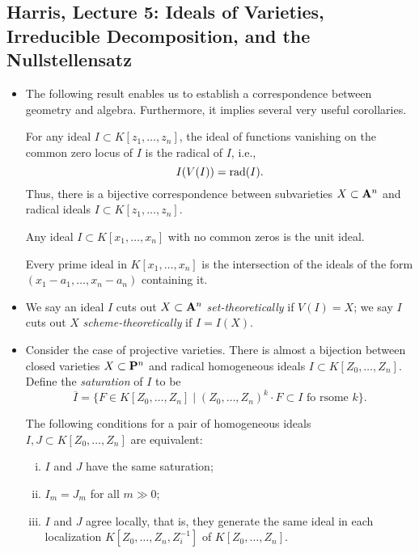 \subsection{Harris, Lecture 5: Ideals of Varieties, Irreducible Decomposition, and the Nullstellensatz}

\begin{itemize}
\item
  The following result enables us to establish a correspondence between geometry and algebra. Furthermore, it implies several very useful corollaries.

  \begin{theorem}[Nullstellensatz]
    For any ideal $I \subset K[z_1, \dots, z_n]$, the ideal of functions vanishing on the common zero locus of $I$ is the radical of $I$, i.e.,
    \[
    I(V(I)) = \rad(I).
    \]
    Thus, there is a bijective correspondence between subvarieties $X \subset \A^n$ and radical ideals $I \subset K[z_1, \dots, z_n]$.
  \end{theorem}

  \begin{theorem}
    Any ideal $I \subset K[x_1, \dots, x_n]$ with no common zeros is the unit ideal.
  \end{theorem}

  \begin{theorem}
    Every prime ideal in $K[x_1, \dots, x_n]$ is the intersection of the ideals of the form $(x_1 - a_1, \dots, x_n - a_n)$ containing it.
  \end{theorem}

\item
  We say an ideal $I$ cuts out $X \subset \A^n$ \emph{set-theoretically} if $V(I) = X$; we say $I$ cuts out $X$ \emph{scheme-theoretically} if $I = I(X)$.

\item
  Consider the case of projective varieties. There is almost a bijection between closed varieties $X \subset \P^n$ and radical homogeneous ideals $I \subset K[Z_0, \dots, Z_n]$. Define the \emph{saturation} of $I$ to be
  \[
  \overline{I} = \{ F \in K[Z_0, \dots, Z_n] \;|\; (Z_0, \dots, Z_n)^k \cdot F \subset I \textrm{ fo rsome } k \}.
  \]

  \begin{proposition}
    The following conditions for a pair of homogeneous ideals $I, J \subset K[Z_0, \dots, Z_n]$ are equivalent:
    \begin{enumerate}[(i)]
    \item $I$ and $J$ have the same saturation;
    \item $I_m = J_m$ for all $m \gg 0$;
    \item $I$ and $J$ agree locally, that is, they generate the same ideal in each localization $K[Z_0, \dots, Z_n, Z_i^{-1}]$ of $K[Z_0, \dots, Z_n]$.
    \end{enumerate}
  \end{proposition}


\end{itemize}
